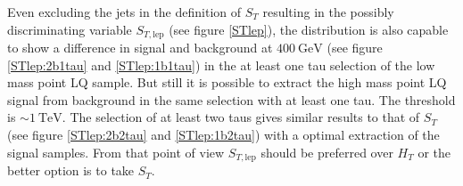 %
Even excluding the jets in the definition of $S_T$ resulting in the possibly discriminating variable $S_{T,\text{lep}}$ (see figure \ref{STlep}), the distribution is also capable to show a difference in signal and background at $\SI{400}{\giga\electronvolt}$ (see figure \ref{STlep:2b1tau} and \ref{STlep:1b1tau}) in the at least one tau selection of the low mass point LQ sample. But still it is possible to extract the high mass point LQ signal from background in the same selection with at least one tau. The threshold is $\sim\SI{1}{\tera\electronvolt}$. The selection of at least two taus gives similar results to that of $S_T$ (see figure \ref{STlep:2b2tau} and \ref{STlep:1b2tau}) with a optimal extraction of the signal samples. From that point of view $S_{T,\text{lep}}$ should be preferred over $H_T$ or the better option is to take $S_T$. \par
%
